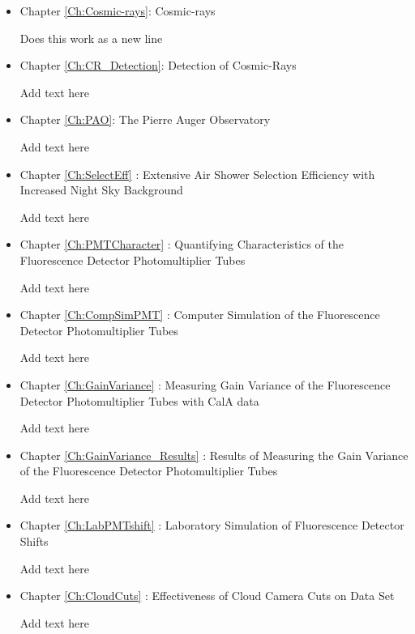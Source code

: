 \begin{itemize}
\item  Chapter \ref{Ch:Cosmic-rays}: Cosmic-rays

Does this work as a new line

\item Chapter \ref{Ch:CR_Detection}: Detection of Cosmic-Rays

Add text here

\item Chapter \ref{Ch:PAO}: The Pierre Auger Observatory

Add text here

\item Chapter \ref{Ch:SelectEff} : Extensive Air Shower Selection Efficiency with Increased Night Sky Background 

Add text here

\item Chapter \ref{Ch:PMTCharacter} : Quantifying Characteristics of the Fluorescence Detector Photomultiplier Tubes 

Add text here

\item Chapter \ref{Ch:CompSimPMT} : Computer Simulation of the Fluorescence Detector Photomultiplier Tubes 

Add text here

\item Chapter \ref{Ch:GainVariance} : Measuring Gain Variance of the Fluorescence Detector Photomultiplier Tubes with CalA data 

Add text here

\item Chapter \ref{Ch:GainVariance_Results} : Results of Measuring the Gain Variance of the Fluorescence Detector Photomultiplier Tubes 

Add text here

\item Chapter \ref{Ch:LabPMTshift} : Laboratory Simulation of Fluorescence Detector Shifts

Add text here

\item Chapter \ref{Ch:CloudCuts} : Effectiveness of Cloud Camera Cuts on Data Set

Add text here

%


\end{itemize}